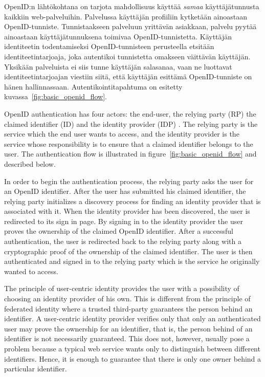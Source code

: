 \documentclass[english,gradu]{tktltiki}
\begin{document}
\label{sec:openid_auth}

OpenID:n lähtökohtana on tarjota mahdollisuus käyttää \emph{samaa} käyttäjätunnusta kaikkiin web-palveluihin.
Palvelussa käyttäjän profiiliin kytketään ainoastaan OpenID-tunniste. Tunnistaakseen palveluun yrittävän asiakkaan, palvelu pyytää ainoastaan käyttäjätunnuksena toimivaa OpenID-tunnistetta. Käyttäjän identiteetin todentamiseksi OpenID-tunnisteen perusteella etsitään identiteetintarjoaja, joka autentikoi tunnistetta omakseen väittävän käyttäjän. Yksikään palveluista ei siis tunne käyttäjän salasanaa, vaan ne luottavat identiteetintarjoajan viestiin siitä, että käyttäjän esittämä OpenID-tunniste on hänen hallinnassaan. Autentikointitapahtuma on esitetty kuvassa~\ref{fig:basic_openid_flow}.

OpenID authentication has four actors: the end-user, the relying party (RP) the claimed identifier (ID) and the identity provider (IDP) \cite{openid_2.0_platform_2009}. The relying party is the service which the end user wants to access, and the identity provider is the service whose responsibility is to ensure that a claimed identifier belongs to the user. The authentication flow is illustrated in figure~\ref{fig:basic_openid_flow} and described below.

In order to begin the authentication process, the relying party asks the user for an OpenID identifier. After the user has submitted his claimed identifier, the relying party initializes a discovery process for finding an identity provider that is associated with it. When the identity provider has been discovered, the user is redirected to its sign in page. By signing in to the identity provider the user proves the ownership of the claimed OpenID identifier. After a successful authentication, the user is redirected back to the relying party along with a cryptographic proof of the ownership of the claimed identifier. The user is then authenticated and signed in to the relying party which is the service he originally wanted to access.

The principle of user-centric identity provides the user with a possibility of choosing an identity provider of his own. This is different from the principle of federated identity where a trusted third-party guarantees the person behind an identifier. A user-centric identity provider verifies only that only an authenticated user may prove the ownership for an identifier, that is, the person behind of an identifier is not necessarily guaranteed. This does not, however, usually pose a problem because a typical web service wants only to distinguish between different identifiers. Hence, it is enough to guarantee that there is only one owner behind a particular identifier.
\end{document}

